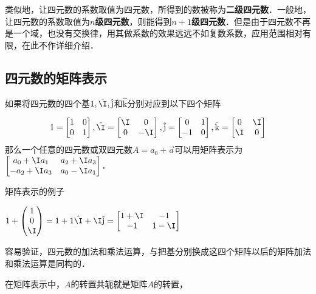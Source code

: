 类似地，让四元数的系数取值为四元数，所得到的数被称为\textbf{二级四元数}．一般地，让四元数的系数取值为$n$\textbf{级四元数}，则能得到$n+1$\textbf{级四元数}．但是由于四元数不再是一个域，也没有交换律，用其做系数的效果远远不如复数系数，应用范围相对有限，在此不作详细介绍．


\subsection{四元数的矩阵表示}

如果将四元数的四个基$1, \hat{\I}, \hat{\mathrm{j}}$和$\hat{\mathrm{k}}$分别对应到以下四个矩阵

\begin{equation}

1=\left[\begin{matrix}1&0\\0&1\end{matrix} \right], \hat{\I}=\left[\begin{matrix}\I&0\\0&-\I\end{matrix} \right], \hat{\mathrm{j}}=\left[\begin{matrix}0&1\\-1&0\end{matrix} \right], \hat{\mathrm{k}}=\left[\begin{matrix}0&\I\\\I&0\end{matrix} \right]

\end{equation}
那么一个任意的四元数或双四元数$A=a_0+\vec{a}$可以用矩阵表示为$\left[\begin{matrix}a_0+\I a_1&a_2+\I a_3\\-a_2+\I a_3&a_0-\I a_1 \end{matrix} \right]$．

\begin{example}{矩阵表示的例子}

$1+\left(\begin{matrix}1\\0\\\I\end{matrix} \right)=1+1\hat{\I}+\I\hat{\mathrm{j}}=\left[\begin{matrix}1+\I&-1\\-1&1-\I\end{matrix} \right]$

\end{example}

容易验证，四元数的加法和乘法运算，与把基分别换成这四个矩阵以后的矩阵加法和乘法运算是同构的．

在矩阵表示中，$A$的转置共轭就是矩阵$A$的转置，




